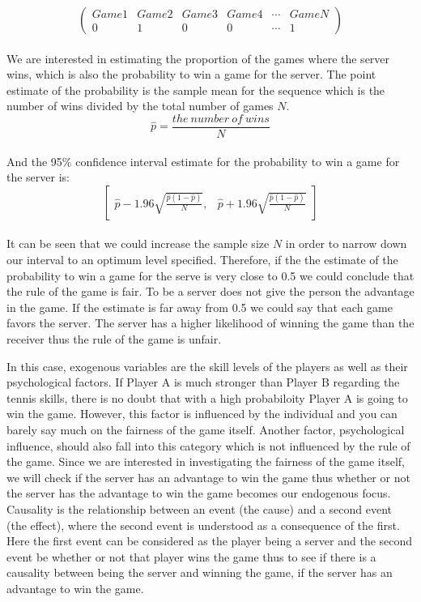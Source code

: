 \documentclass[12pt]{article}
\begin{document}
$$\left( \begin{array}{cccccc} Game1 & Game2 & Game3 & Game 4 & \cdots&Game N \\
0 & 1&0&0&\cdots&1 \end{array} \right)$$
\\
We are interested in estimating the proportion of the games where the server wins, which is also the probability to win a game for the server. The point estimate of the probability is the sample mean for the sequence which is the number of wins divided by the total number of games $N$.\\
$$\hat p=\frac{ the~number~of~wins}{N}$$
\\
And the 95\% confidence interval estimate for the probability to win a game for the server is:
$$\mbox{} \left[ \begin{array}{ccc}
\hat p-1.96\sqrt{\frac{\hat p(1-\hat p)}{N}} ,& \hat p+1.96\sqrt{\frac{\hat p(1-\hat p)}{N}}  \end{array} \right]$$\\

It can be seen that we could increase the sample size $N$ in order to narrow down our interval to an optimum level specified. Therefore, if the the estimate of the probability to win a game for the serve is very close to 0.5 we could conclude that the rule of the game is fair. To be a server does not give the person the advantage in the game. If the estimate is far away from 0.5 we could say that each game favors the server. The server has a higher likelihood of winning the game than the receiver thus the rule of the game is unfair.

In this case, exogenous variables are the skill levels of the players as well as their psychological factors. If Player A is much stronger than Player B regarding the tennis skills, there is no doubt that with a high probabiloity Player A is going to win the game. However, this factor is influenced by the individual and you can barely say much on the fairness of the game itself. Another factor, psychological influence, should also fall into this category which is not influenced by the rule of the game. Since we are interested in investigating the fairness of the game itself, we will check if the server has an advantage to win the game thus whether or not the server has the advantage to win the game becomes our endogenous focus. Causality is the relationship between an event (the cause) and a second event (the effect), where the second event is understood as a consequence of the first. Here the first event can be considered as the player being a server and the second event be whether or not that player wins the game thus to see if there is a causality between being the server and winning the game, if the server has an advantage to win the game.\\
\end{document}
